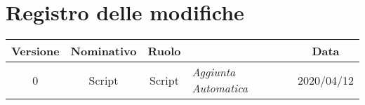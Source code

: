 \section*{Registro delle modifiche}
\renewcommand{\arraystretch}{1.8}

    \begin{longtable}{|c|c|c|p{3.8cm}|c|}
        \hline
        \rowcolor{header}
        \textbf{Versione} & \textbf{Nominativo} & \textbf{Ruolo} & \centering{\textbf{Descrizione}} & \textbf{Data} \\ 
        \hline 
        0 & Script & Script & \small{\textit{ Aggiunta Automatica }} & 2020/04/12 \\ 
        \hline
    \end{longtable}